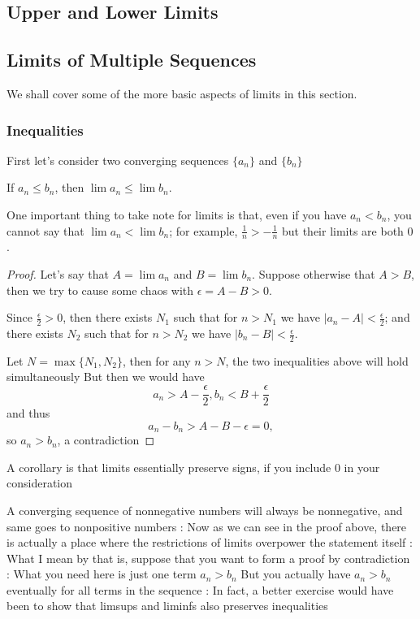 \subsection{Upper and Lower Limits}


\subsection{Limits of Multiple Sequences}
We shall cover some of the more basic aspects of limits in this section.

\subsubsection{Inequalities}

First let's consider two converging sequences $\{a_n\}$ and $\{b_n\}$

If $a_n \le b_n$, then $\lim a_n \le \lim b_n$.

\begin{remark}
One important thing to take note for limits is that, even if you have $a_n<b_n$, you cannot say that $\lim a_n<\lim b_n$; for example, $\frac{1}{n}>-\frac{1}{n}$ but their limits are both $0$.
\end{remark}

\begin{proof}
Let's say that $A=\lim a_n$ and $B=\lim b_n$. Suppose otherwise that $A>B$, then we try to cause some chaos with $\epsilon=A-B>0$.

Since $\frac{\epsilon}{2}>0$, then there exists $N_1$ such that for $n>N_1$ we have $|a_n-A|<\frac{\epsilon}{2}$; and there exists $N_2$ such that for $n>N_2$ we have $|b_n-B|<\frac{\epsilon}{2}$.

Let $N=\max\{N_1,N_2\}$, then for any $n>N$, the two inequalities above will hold simultaneously
But then we would have
\[ a_n>A-\frac{\epsilon}{2}, b_n<B+\frac{\epsilon}{2} \]
and thus
\[ a_n-b_n>A-B-\epsilon=0, \]
so $a_n>b_n$, a contradiction
\end{proof}

A corollary is that limits essentially preserve signs, if you include 0 in your consideration

A converging sequence of nonnegative numbers will always be nonnegative, and same goes to nonpositive numbers
:
Now as we can see in the proof above, there is actually a place where the restrictions of limits overpower the statement itself
:
What I mean by that is, suppose that you want to form a proof by contradiction
:
What you need here is just one term $a_n>b_n$
But you actually have $a_n>b_n$ eventually for all terms in the sequence
:
In fact, a better exercise would have been to show that limsups and liminfs also preserves inequalities

